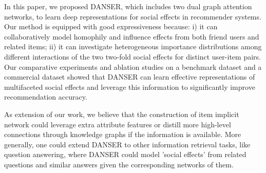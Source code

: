 \documentclass[sigconf]{acmart}
\begin{document}
In this paper, we propose{d} DANSER, {which includes two} dual graph attention networks, to learn deep representations for social effects in recommender systems. Our method is equipped with good expressiveness because: i) it can collaboratively model homophily and influence effects from both friend users and related items; ii) it can investigate heterogeneous importance distributions among different interactions of {the} two two-fold social effects for distinct user-item pairs. Our comparative experiments and ablation studies on a benchmark dataset and a commercial dataset {showed} that DANSER {can} learn effective representations of multifaceted social effects and leverage this information to significantly improve recommendation accuracy.

{As extension of our work, we believe that the construction of item implicit network could leverage extra attribute features or distill more high-level connections through knowledge graphs if the information is available.
More generally, one could extend DANSER to other information retrieval tasks, like question answering, where DANSER could model 'social effects' from related questions and similar answers given the corresponding networks of them.}




\end{document}
